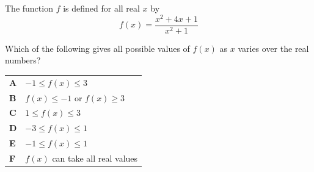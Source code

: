 \documentclass[11pt,a4paper]{article}
\begin{document}
\clearpage
\thispagestyle{djspaper}
\vspace*{8pt}
\begin{enumerate}[label=\textbf{\arabic*.},leftmargin=*,itemsep=0pt,start=12]
\questionitem[Inequalities]
The function $f$ is defined for all real $x$ by
\[
f(x)=\frac{x^{2}+4x+1}{x^{2}+1}
\]

Which of the following gives all possible values of \(f(x)\) as \(x\) varies over the real numbers?

\par\vspace*{12pt}
\begin{tabularx}{\linewidth}{@{}>{\bfseries}l Y@{}}
A &
$-1 \le f(x) \le 3$
\\[0.8em]
B &
$f(x) \le -1$ or $f(x) \ge 3$
\\[0.8em]
C &
$1 \le f(x) \le 3$
\\[0.8em]
D &
$-3 \le f(x) \le 1$
\\[0.8em]
E &
$-1 \le f(x) \le 1$
\\[0.8em]
F &
$f(x)$ can take all real values
\\
\end{tabularx}
\end{enumerate}
\clearpage
\thispagestyle{djspaper}
\vspace*{8pt}
\end{document}
